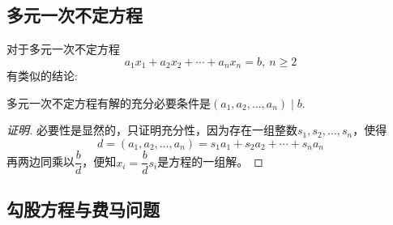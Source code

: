 \subsection{多元一次不定方程}
\label{sec:indefinite-equation-with-many-variable-one-degree}

对于多元一次不定方程
\[ a_1x_1+a_2x_2+\cdots+a_nx_n=b, \  n \geqslant 2 \]
有类似的结论:
\begin{theorem}
  多元一次不定方程有解的充分必要条件是$(a_1,a_2,\ldots,a_n) \mid b$.
\end{theorem}

\begin{proof}[证明]
  必要性是显然的，只证明充分性，因为存在一组整数$s_1,s_2,\ldots,s_n$，使得
  \[ d = (a_1,a_2,\ldots,a_n) = s_1a_1+s_2a_2+\cdots+s_na_n \]
  再两边同乘以$\dfrac{b}{d}$，便知$x_i=\dfrac{b}{d}s_i$是方程的一组解。
\end{proof}

\subsection{勾股方程与费马问题}
\label{sec:pythagorean-equation-and-fermat-problem}


